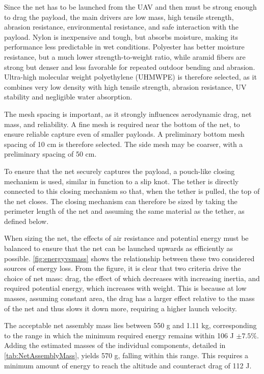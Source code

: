 Since the net has to be launched from the UAV and then must be strong enough to drag the payload, the main drivers are low mass, high tensile strength, abrasion resistance, environmental resistance, and safe interaction with the payload. Nylon is inexpensive and tough, but absorbs moisture, making its performance less predictable in wet conditions. Polyester has better moisture resistance, but a much lower strength-to-weight ratio, while aramid fibers are strong but denser and less favorable for repeated outdoor bending and abrasion. Ultra-high molecular weight polyethylene (UHMWPE) is therefore selected, as it combines very low density with high tensile strength, abrasion resistance, UV stability and negligible water absorption.

The mesh spacing is important, as it strongly influences aerodynamic drag, net mass, and reliability. A fine mesh is required near the bottom of the net, to ensure reliable capture even of smaller payloads. A preliminary bottom mesh spacing of 10 cm is therefore selected. The side mesh may be coarser, with a preliminary spacing of 50 cm.

To ensure that the net securely captures the payload, a pouch-like closing mechanism is used, similar in function to a slip knot. The tether is directly connected to this closing mechanism so that, when the tether is pulled, the top of the net closes. The closing mechanism can therefore be sized by taking the perimeter length of the net and assuming the same material as the tether, as defined below.

When sizing the net, the effects of air resistance and potential energy must be balanced to ensure that the net can be launched upwards as efficiently as possible. \autoref{fig:energyvsmass} shows the relationship between these two considered sources of energy loss. From the figure, it is clear that two criteria drive the choice of net mass: drag, the effect of which decreases with increasing inertia, and required potential energy, which increases with weight. This is because at low masses, assuming constant area, the drag has a larger effect relative to the mass of the net and thus slows it down more, requiring a higher launch velocity. 


The acceptable net assembly mass lies between 550 g and 1.11 kg, corresponding to the range in which the minimum required energy remains within 106 J $\pm 7.5\%$. Adding the estimated masses of the individual components, detailed in \autoref{tab:NetAssemblyMass}, yields 570 g, falling within this range. This requires a minimum amount of energy to reach the altitude and counteract drag of 112 J. 

